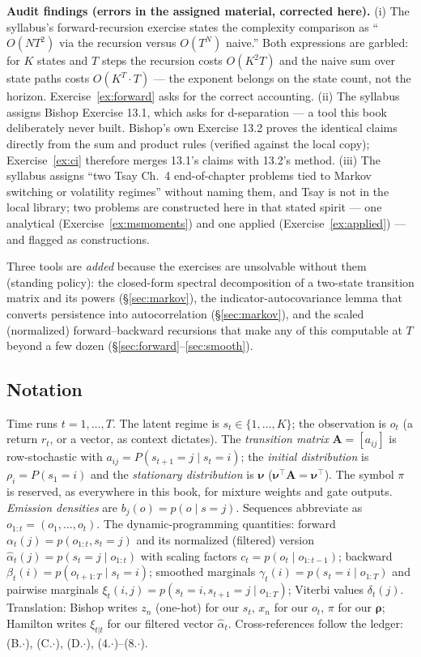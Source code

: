 \documentclass[11pt]{article}
\numberwithin{equation}{section}
\theoremstyle{plain}
\theoremstyle{definition}
\theoremstyle{remark}
\newcounter{exercise}
\newcommand{\T}{\top}
\newcommand{\bA}{\bm{A}}
\newcommand{\brho}{\bm{\rho}}
\newcommand{\bnu}{\bm{\nu}}
\newcommand{\alh}{\hat{\alpha}}
\newcommand{\resp}{\gamma}
\begin{document}
\textbf{Audit findings (errors in the assigned material, corrected here).} (i) The syllabus's forward-recursion exercise states the complexity comparison as ``$O(NT^2)$ via the recursion versus $O(T^N)$ naive.'' Both expressions are garbled: for $K$ states and $T$ steps the recursion costs $O(K^2 T)$ and the naive sum over state paths costs $O(K^T \cdot T)$ --- the exponent belongs on the state count, not the horizon. Exercise~\ref{ex:forward} asks for the correct accounting. (ii) The syllabus assigns Bishop Exercise 13.1, which asks for d-separation --- a tool this book deliberately never built. Bishop's own Exercise 13.2 proves the identical claims directly from the sum and product rules (verified against the local copy); Exercise~\ref{ex:ci} therefore merges 13.1's claims with 13.2's method. (iii) The syllabus assigns ``two Tsay Ch.\ 4 end-of-chapter problems tied to Markov switching or volatility regimes'' without naming them, and Tsay is not in the local library; two problems are constructed here in that stated spirit --- one analytical (Exercise~\ref{ex:msmoments}) and one applied (Exercise~\ref{ex:applied}) --- and flagged as constructions.

Three tools are \emph{added} because the exercises are unsolvable without them (standing policy): the closed-form spectral decomposition of a two-state transition matrix and its powers (\S\ref{sec:markov}), the indicator-autocovariance lemma that converts persistence into autocorrelation (\S\ref{sec:markov}), and the scaled (normalized) forward--backward recursions that make any of this computable at $T$ beyond a few dozen (\S\ref{sec:forward}--\ref{sec:smooth}).

\subsection*{Notation}

Time runs $t = 1, \dots, T$. The latent regime is $s_t \in \{1, \dots, K\}$; the observation is $o_t$ (a return $r_t$, or a vector, as context dictates). The \emph{transition matrix} $\bA = [a_{ij}]$ is row-stochastic with $a_{ij} = P(s_{t+1} = j \mid s_t = i)$; the \emph{initial distribution} is $\rho_i = P(s_1 = i)$ and the \emph{stationary distribution} is $\bnu$ ($\bnu^\T \bA = \bnu^\T$). The symbol $\pi$ is reserved, as everywhere in this book, for mixture weights and gate outputs. \emph{Emission densities} are $b_j(o) = p(o \mid s = j)$. Sequences abbreviate as $o_{1:t} = (o_1, \dots, o_t)$. The dynamic-programming quantities: forward $\alpha_t(j) = p(o_{1:t}, s_t = j)$ and its normalized (filtered) version $\alh_t(j) = p(s_t = j \mid o_{1:t})$ with scaling factors $c_t = p(o_t \mid o_{1:t-1})$; backward $\beta_t(i) = p(o_{t+1:T} \mid s_t = i)$; smoothed marginals $\resp_t(i) = p(s_t = i \mid o_{1:T})$ and pairwise marginals $\xi_t(i,j) = p(s_t = i, s_{t+1} = j \mid o_{1:T})$; Viterbi values $\delta_t(j)$. Translation: Bishop writes $z_n$ (one-hot) for our $s_t$, $x_n$ for our $o_t$, $\pi$ for our $\brho$; Hamilton writes $\xi_{t|t}$ for our filtered vector $\alh_t$. Cross-references follow the ledger: (B.$\cdot$), (C.$\cdot$), (D.$\cdot$), (4.$\cdot$)--(8.$\cdot$).
\end{document}
